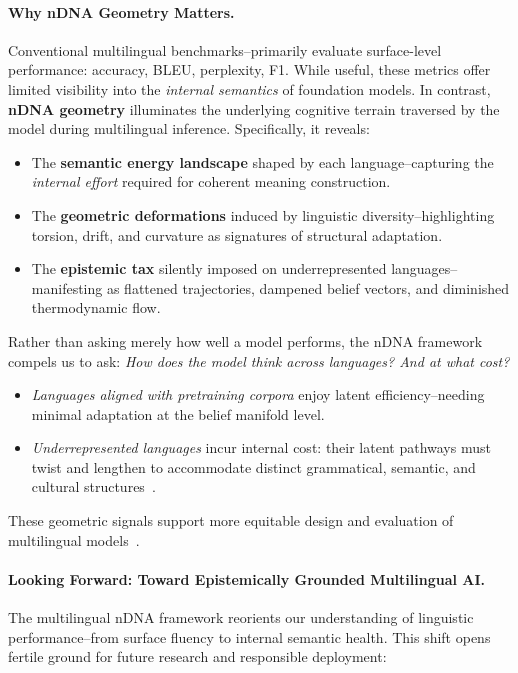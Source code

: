 \paragraph{Why nDNA Geometry Matters.}
Conventional multilingual benchmarks--primarily evaluate surface-level performance: accuracy, BLEU, perplexity, F1. While useful, these metrics offer limited visibility into the \emph{internal semantics} of foundation models. In contrast, \textbf{nDNA geometry} illuminates the underlying cognitive terrain traversed by the model during multilingual inference. Specifically, it reveals:
\begin{itemize}[leftmargin=1.5em]
    \item The \textbf{semantic energy landscape} shaped by each language--capturing the \emph{internal effort} required for coherent meaning construction.
    \item The \textbf{geometric deformations} induced by linguistic diversity--highlighting torsion, drift, and curvature as signatures of structural adaptation.
    \item The \textbf{epistemic tax} silently imposed on underrepresented languages--manifesting as flattened trajectories, dampened belief vectors, and diminished thermodynamic flow.
\end{itemize}
Rather than asking merely how well a model performs, the nDNA framework compels us to ask: \emph{How does the model think across languages? And at what cost?}

\begin{itemize}[leftmargin=1.5em]
    \item \emph{Languages aligned with pretraining corpora} enjoy latent efficiency--needing minimal adaptation at the belief manifold level.
    \item \emph{Underrepresented languages} incur internal cost: their latent pathways must twist and lengthen to accommodate distinct grammatical, semantic, and cultural structures~\citep{blodgett2020language, wang2023culturalbias}.
\end{itemize}

These geometric signals support more equitable design and evaluation of multilingual models~\citep{laurens2024anthropic, ganguli2023reducing}.

\paragraph{Looking Forward: Toward Epistemically Grounded Multilingual AI.}
The multilingual nDNA framework reorients our understanding of linguistic performance--from surface fluency to internal semantic health. This shift opens fertile ground for future research and responsible deployment:

